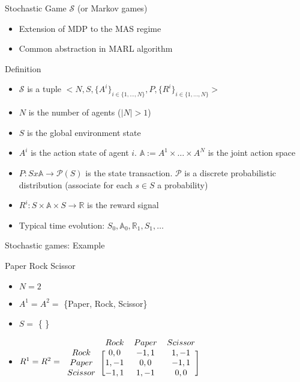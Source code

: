 \documentclass[presentation]{beamer}\mode<presentation>{\usetheme{AMSBolognaFC}}
\begin{document}
\begin{frame}[c]{Stochastic Game $\mathcal{S}$ (or Markov games)}
	\begin{alertblock}{}
		\begin{itemize}
			\item Extension of MDP to the MAS regime
			\item Common abstraction in MARL algorithm
		\end{itemize}
	\end{alertblock}
	\begin{alertblock}{Definition}
		\begin{itemize}
			\item $\mathcal{S}$ is a tuple $<N, S, \{A^i\}_{i \in \{ 1, \dots, N\}}, P, \{R^i\}_{i \in \{ 1, \dots, N\}}>$
			\item $N$ is the number of agents ($|N| > 1 $)
			\item $S$ is the global environment state
			\item $A^i$ is the action state of agent $i$. $\mathbb{A} := A^1 \times \dots\times A^N$ is the joint action space
			\item $P: S x \mathbb{A} \rightarrow \mathcal{P}(S)$ is the state transaction. $\mathcal{P}$ is a discrete probabilistic distribution (associate for each $s \in S$ a probability)
			\item $R^i: S \times \mathbb{A} \times S \rightarrow \mathbb{R}$ is the reward signal
			\item Typical time evolution: $ S_0, \mathbb{A}_0, \mathbb{R}_1, S_1, \dots  $
		\end{itemize}
	\end{alertblock}
\end{frame}
\begin{frame}[fragile]{Stochastic games: Example}
	\begin{exampleblock}{Paper Rock Scissor}
		\begin{itemize}
			\item $N = 2$
			\item $A^1 = A^2 = $ \{Paper, Rock, Scissor\}
			\item $S = $ \{ \}
			\item $R^1 = R^2 = \begin{blockarray}{cccc}
        & Rock & Paper & Scissor \\
      \begin{block}{c[ccc]}
        Rock    & 0, 0  & -1, 1 & 1, -1 \\
        Paper   & 1, -1 & 0, 0  & -1, 1 \\
        Scissor & -1, 1 & 1, -1 & 0, 0 \\
      \end{block}
    \end{blockarray}$
		\end{itemize}
	\end{exampleblock}
\end{frame}
\end{document}
